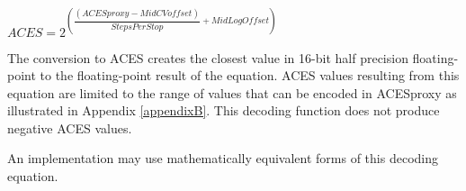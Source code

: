 \begin{center}
$ACES = 2^{\left( \dfrac{(ACESproxy-MidCVoffset)}{StepsPerStop} + MidLogOffset\right)}$

\end{center}

The conversion to ACES creates the closest value in 16-bit half precision floating-point to the floating-point result of the equation. ACES values resulting from this equation are limited to the range of values that can be encoded in ACESproxy as illustrated in Appendix \ref{appendixB}. This decoding function does not produce negative ACES values.


An implementation may use mathematically equivalent forms of this decoding equation.